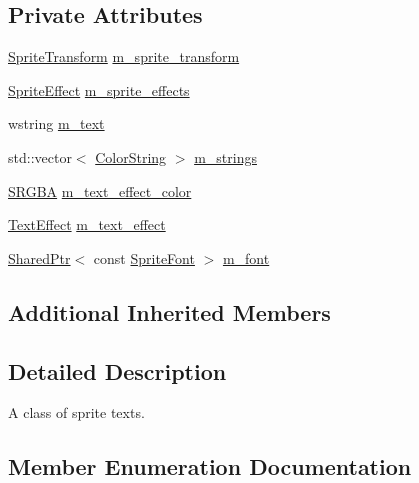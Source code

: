 \subsection*{Private Attributes}
\begin{DoxyCompactItemize}
\item 
\hyperlink{classmage_1_1_sprite_transform}{Sprite\+Transform} \hyperlink{classmage_1_1_sprite_text_ade755cb73d8db4f388063cda1a351c50}{m\+\_\+sprite\+\_\+transform}
\item 
\hyperlink{namespacemage_a9cfe18123066ba4236f548f9de75d881}{Sprite\+Effect} \hyperlink{classmage_1_1_sprite_text_acc64029be6634cac0651ceaaa0f84a3b}{m\+\_\+sprite\+\_\+effects}
\item 
wstring \hyperlink{classmage_1_1_sprite_text_a807d5dc467ef16f6c83762dfe6ad3391}{m\+\_\+text}
\item 
std\+::vector$<$ \hyperlink{classmage_1_1_color_string}{Color\+String} $>$ \hyperlink{classmage_1_1_sprite_text_aadda462c0b67282ef86a7cb2b235367c}{m\+\_\+strings}
\item 
\hyperlink{structmage_1_1_s_r_g_b_a}{S\+R\+G\+BA} \hyperlink{classmage_1_1_sprite_text_a82f53e64dc8cc9a9d23a1c26ee9fad9e}{m\+\_\+text\+\_\+effect\+\_\+color}
\item 
\hyperlink{classmage_1_1_sprite_text_ac60331e941d1f76551b7bdfad6ee7324}{Text\+Effect} \hyperlink{classmage_1_1_sprite_text_a4019b7510bba20a9b86460fd6c47698f}{m\+\_\+text\+\_\+effect}
\item 
\hyperlink{namespacemage_a1e01ae66713838a7a67d30e44c67703e}{Shared\+Ptr}$<$ const \hyperlink{classmage_1_1_sprite_font}{Sprite\+Font} $>$ \hyperlink{classmage_1_1_sprite_text_a7d5f122cd5a87e47786796e41dbf6b71}{m\+\_\+font}
\end{DoxyCompactItemize}
\subsection*{Additional Inherited Members}


\subsection{Detailed Description}
A class of sprite texts. 

\subsection{Member Enumeration Documentation}
\hypertarget{classmage_1_1_sprite_text_ac60331e941d1f76551b7bdfad6ee7324}{}\label{classmage_1_1_sprite_text_ac60331e941d1f76551b7bdfad6ee7324} 
